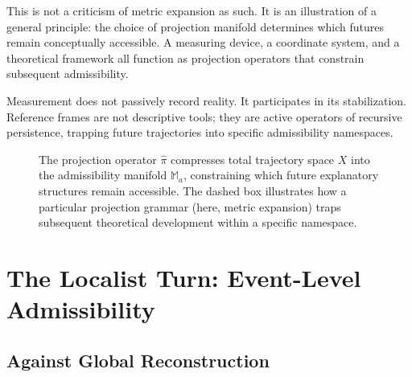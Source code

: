 \documentclass[12pt, a4paper]{article}
\newcommand{\proj}{\hat{\pi}}
\newcommand{\Madm}{\mathbb{M}_{a}}
\newcommand{\Xtraj}{X}
\begin{document}
This is not a criticism of metric expansion as such. It is an illustration
of a general principle: the choice of projection manifold determines which
futures remain conceptually accessible. A measuring device, a coordinate
system, and a theoretical framework all function as projection operators
that constrain subsequent admissibility.

Measurement does not passively record reality. It participates in its
stabilization. Reference frames are not descriptive tools; they are active
operators of recursive persistence, trapping future trajectories into
specific admissibility namespaces.

\begin{figure}[H]
\centering
{}
\caption{The projection operator \(\proj\) compresses total trajectory space
\(\Xtraj\) into the admissibility manifold \(\Madm\), constraining which
future explanatory structures remain accessible. The dashed box illustrates
how a particular projection grammar (here, metric expansion) traps subsequent
theoretical development within a specific namespace.}
\end{figure}

\section{The Localist Turn: Event-Level Admissibility}

\subsection{Against Global Reconstruction}
\end{document}
